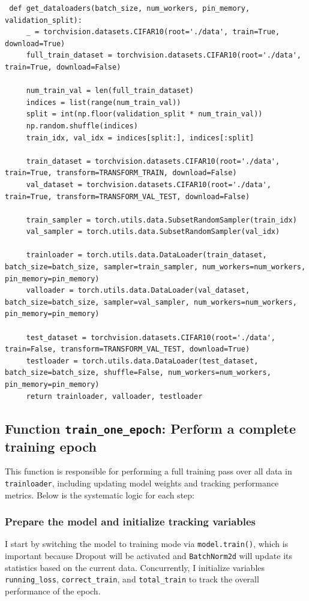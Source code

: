\documentclass[12pt, a4paper, openany]{report}
\begin{document}
 \begin{verbatim}
 def get_dataloaders(batch_size, num_workers, pin_memory, validation_split):
     _ = torchvision.datasets.CIFAR10(root='./data', train=True, download=True)
     full_train_dataset = torchvision.datasets.CIFAR10(root='./data', train=True, download=False)

     num_train_val = len(full_train_dataset)
     indices = list(range(num_train_val))
     split = int(np.floor(validation_split * num_train_val))
     np.random.shuffle(indices)
     train_idx, val_idx = indices[split:], indices[:split]

     train_dataset = torchvision.datasets.CIFAR10(root='./data', train=True, transform=TRANSFORM_TRAIN, download=False)
     val_dataset = torchvision.datasets.CIFAR10(root='./data', train=True, transform=TRANSFORM_VAL_TEST, download=False)

     train_sampler = torch.utils.data.SubsetRandomSampler(train_idx)
     val_sampler = torch.utils.data.SubsetRandomSampler(val_idx)

     trainloader = torch.utils.data.DataLoader(train_dataset, batch_size=batch_size, sampler=train_sampler, num_workers=num_workers, pin_memory=pin_memory)
     valloader = torch.utils.data.DataLoader(val_dataset, batch_size=batch_size, sampler=val_sampler, num_workers=num_workers, pin_memory=pin_memory)

     test_dataset = torchvision.datasets.CIFAR10(root='./data', train=False, transform=TRANSFORM_VAL_TEST, download=True)
     testloader = torch.utils.data.DataLoader(test_dataset, batch_size=batch_size, shuffle=False, num_workers=num_workers, pin_memory=pin_memory)
     return trainloader, valloader, testloader
 \end{verbatim}

 \subsection{Function \texttt{train\_one\_epoch}: Perform a complete training epoch} %
 This function is responsible for performing a full training pass over all data in \texttt{trainloader}, including updating model weights and tracking performance metrics. Below is the systematic logic for each step:

 \subsubsection*{Prepare the model and initialize tracking variables} %
 I start by switching the model to training mode via \texttt{model.train()}, which is important because Dropout will be activated and \texttt{BatchNorm2d} will update its statistics based on the current data. Concurrently, I initialize variables \texttt{running\_loss}, \texttt{correct\_train}, and \texttt{total\_train} to track the overall performance of the epoch.
\end{document}
